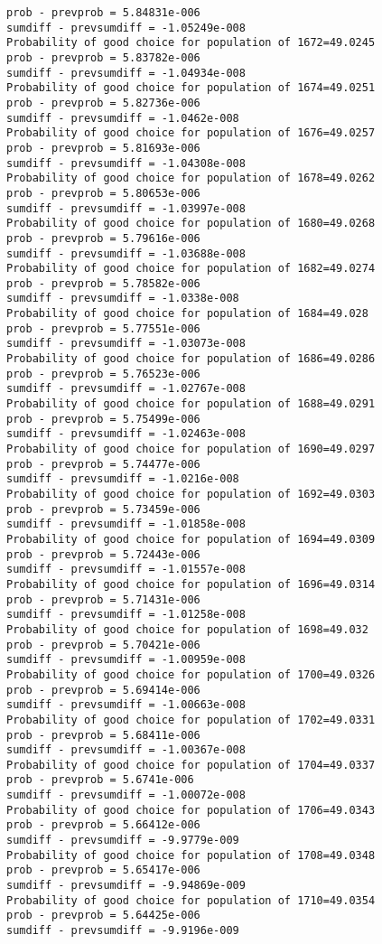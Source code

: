 \documentclass[11pt,onecolumn]{article}
\begin{document}
\begin{verbatim}
prob - prevprob = 5.84831e-006
sumdiff - prevsumdiff = -1.05249e-008
Probability of good choice for population of 1672=49.0245
prob - prevprob = 5.83782e-006
sumdiff - prevsumdiff = -1.04934e-008
Probability of good choice for population of 1674=49.0251
prob - prevprob = 5.82736e-006
sumdiff - prevsumdiff = -1.0462e-008
Probability of good choice for population of 1676=49.0257
prob - prevprob = 5.81693e-006
sumdiff - prevsumdiff = -1.04308e-008
Probability of good choice for population of 1678=49.0262
prob - prevprob = 5.80653e-006
sumdiff - prevsumdiff = -1.03997e-008
Probability of good choice for population of 1680=49.0268
prob - prevprob = 5.79616e-006
sumdiff - prevsumdiff = -1.03688e-008
Probability of good choice for population of 1682=49.0274
prob - prevprob = 5.78582e-006
sumdiff - prevsumdiff = -1.0338e-008
Probability of good choice for population of 1684=49.028
prob - prevprob = 5.77551e-006
sumdiff - prevsumdiff = -1.03073e-008
Probability of good choice for population of 1686=49.0286
prob - prevprob = 5.76523e-006
sumdiff - prevsumdiff = -1.02767e-008
Probability of good choice for population of 1688=49.0291
prob - prevprob = 5.75499e-006
sumdiff - prevsumdiff = -1.02463e-008
Probability of good choice for population of 1690=49.0297
prob - prevprob = 5.74477e-006
sumdiff - prevsumdiff = -1.0216e-008
Probability of good choice for population of 1692=49.0303
prob - prevprob = 5.73459e-006
sumdiff - prevsumdiff = -1.01858e-008
Probability of good choice for population of 1694=49.0309
prob - prevprob = 5.72443e-006
sumdiff - prevsumdiff = -1.01557e-008
Probability of good choice for population of 1696=49.0314
prob - prevprob = 5.71431e-006
sumdiff - prevsumdiff = -1.01258e-008
Probability of good choice for population of 1698=49.032
prob - prevprob = 5.70421e-006
sumdiff - prevsumdiff = -1.00959e-008
Probability of good choice for population of 1700=49.0326
prob - prevprob = 5.69414e-006
sumdiff - prevsumdiff = -1.00663e-008
Probability of good choice for population of 1702=49.0331
prob - prevprob = 5.68411e-006
sumdiff - prevsumdiff = -1.00367e-008
Probability of good choice for population of 1704=49.0337
prob - prevprob = 5.6741e-006
sumdiff - prevsumdiff = -1.00072e-008
Probability of good choice for population of 1706=49.0343
prob - prevprob = 5.66412e-006
sumdiff - prevsumdiff = -9.9779e-009
Probability of good choice for population of 1708=49.0348
prob - prevprob = 5.65417e-006
sumdiff - prevsumdiff = -9.94869e-009
Probability of good choice for population of 1710=49.0354
prob - prevprob = 5.64425e-006
sumdiff - prevsumdiff = -9.9196e-009

\end{verbatim}
\end{document}
